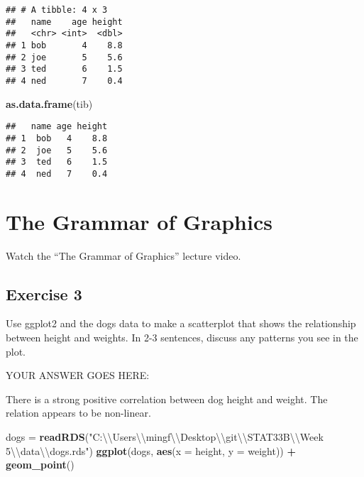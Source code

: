 \documentclass[
]{article}
\newenvironment{Shaded}{\begin{snugshade}}{\end{snugshade}}
\newcommand{\CharTok}[1]{\textcolor[rgb]{0.31,0.60,0.02}{#1}}
\newcommand{\DataTypeTok}[1]{\textcolor[rgb]{0.13,0.29,0.53}{#1}}
\newcommand{\KeywordTok}[1]{\textcolor[rgb]{0.13,0.29,0.53}{\textbf{#1}}}
\newcommand{\NormalTok}[1]{#1}
\newcommand{\OperatorTok}[1]{\textcolor[rgb]{0.81,0.36,0.00}{\textbf{#1}}}
\newcommand{\StringTok}[1]{\textcolor[rgb]{0.31,0.60,0.02}{#1}}
\begin{document}
\begin{verbatim}
## # A tibble: 4 x 3
##   name    age height
##   <chr> <int>  <dbl>
## 1 bob       4    8.8
## 2 joe       5    5.6
## 3 ted       6    1.5
## 4 ned       7    0.4
\end{verbatim}

\begin{Shaded}
\begin{Highlighting}[]
\KeywordTok{as.data.frame}\NormalTok{(tib)}
\end{Highlighting}
\end{Shaded}

\begin{verbatim}
##   name age height
## 1  bob   4    8.8
## 2  joe   5    5.6
## 3  ted   6    1.5
## 4  ned   7    0.4
\end{verbatim}

\hypertarget{the-grammar-of-graphics}{%
\section{The Grammar of Graphics}\label{the-grammar-of-graphics}}

Watch the ``The Grammar of Graphics'' lecture video.

\hypertarget{exercise-3}{%
\subsection{Exercise 3}\label{exercise-3}}

Use ggplot2 and the dogs data to make a scatterplot that shows the
relationship between height and weights. In 2-3 sentences, discuss any
patterns you see in the plot.

YOUR ANSWER GOES HERE:

There is a strong positive correlation between dog height and weight.
The relation appears to be non-linear.

\begin{Shaded}
\begin{Highlighting}[]
\NormalTok{dogs =}\StringTok{ }\KeywordTok{readRDS}\NormalTok{(}\StringTok{"C:}\CharTok{\textbackslash{}\textbackslash{}}\StringTok{Users}\CharTok{\textbackslash{}\textbackslash{}}\StringTok{mingf}\CharTok{\textbackslash{}\textbackslash{}}\StringTok{Desktop}\CharTok{\textbackslash{}\textbackslash{}}\StringTok{git}\CharTok{\textbackslash{}\textbackslash{}}\StringTok{STAT33B}\CharTok{\textbackslash{}\textbackslash{}}\StringTok{Week 5}\CharTok{\textbackslash{}\textbackslash{}}\StringTok{data}\CharTok{\textbackslash{}\textbackslash{}}\StringTok{dogs.rds"}\NormalTok{)}
\KeywordTok{ggplot}\NormalTok{(dogs, }\KeywordTok{aes}\NormalTok{(}\DataTypeTok{x =}\NormalTok{ height, }\DataTypeTok{y =}\NormalTok{ weight)) }\OperatorTok{+}\StringTok{ }\KeywordTok{geom\_point}\NormalTok{()}
\end{Highlighting}
\end{Shaded}
\end{document}
